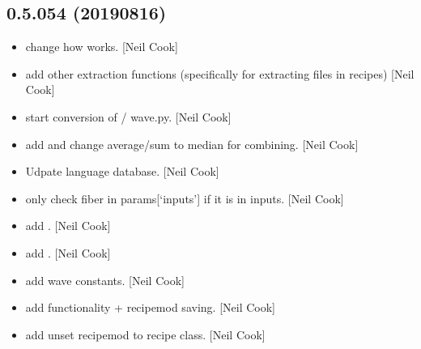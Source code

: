 \documentclass[a4paper,10pt,english]{report}
\begin{document}
\subsection{0.5.054 (2019\sphinxhyphen{}08\sphinxhyphen{}16)}
\label{\detokenize{misc/changelog:id108}}\begin{itemize}
\item {} 
 \sphinxhyphen{} change how  works.
{[}Neil Cook{]}

\item {} 
 \sphinxhyphen{} add other extraction functions
(specifically for extracting files in recipes) {[}Neil Cook{]}

\item {} 
 \sphinxhyphen{} start conversion of  /
wave.py. {[}Neil Cook{]}

\item {} 
 \sphinxhyphen{} add  and change average/sum to median
for combining. {[}Neil Cook{]}

\item {} 
Udpate language database. {[}Neil Cook{]}

\item {} 
 \sphinxhyphen{} only check fiber in params{[}‘inputs’{]} if it is in
inputs. {[}Neil Cook{]}

\item {} 
 \sphinxhyphen{} add . {[}Neil Cook{]}

\item {} 
 \sphinxhyphen{} add . {[}Neil Cook{]}

\item {} 
 \sphinxhyphen{} add wave constants. {[}Neil
Cook{]}

\item {} 
 \sphinxhyphen{} add  functionality + recipemod
saving. {[}Neil Cook{]}

\item {} 
 \sphinxhyphen{} add unset recipemod to recipe class. {[}Neil
Cook{]}


\end{itemize}
\end{document}
